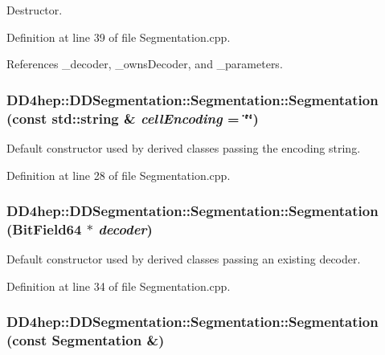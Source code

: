 Destructor. 

Definition at line 39 of file Segmentation.cpp.

References \_\-decoder, \_\-ownsDecoder, and \_\-parameters.\hypertarget{class_d_d4hep_1_1_d_d_segmentation_1_1_segmentation_a52364d20f9930e867d682ad453900e65}{
\subsubsection[{Segmentation}]{\setlength{\rightskip}{0pt plus 5cm}DD4hep::DDSegmentation::Segmentation::Segmentation (const std::string \& {\em cellEncoding} = {\ttfamily \char`\"{}\char`\"{}})}}
\label{class_d_d4hep_1_1_d_d_segmentation_1_1_segmentation_a52364d20f9930e867d682ad453900e65}


Default constructor used by derived classes passing the encoding string. 

Definition at line 28 of file Segmentation.cpp.\hypertarget{class_d_d4hep_1_1_d_d_segmentation_1_1_segmentation_a2c565cf9552a24845ed91c686fc63f40}{
\subsubsection[{Segmentation}]{\setlength{\rightskip}{0pt plus 5cm}DD4hep::DDSegmentation::Segmentation::Segmentation ({\bf BitField64} $\ast$ {\em decoder})}}
\label{class_d_d4hep_1_1_d_d_segmentation_1_1_segmentation_a2c565cf9552a24845ed91c686fc63f40}


Default constructor used by derived classes passing an existing decoder. 

Definition at line 34 of file Segmentation.cpp.\hypertarget{class_d_d4hep_1_1_d_d_segmentation_1_1_segmentation_aba1d0cb4ca5528c499ecde5f6000ae01}{
\subsubsection[{Segmentation}]{\setlength{\rightskip}{0pt plus 5cm}DD4hep::DDSegmentation::Segmentation::Segmentation (const {\bf Segmentation} \&)}}
\label{class_d_d4hep_1_1_d_d_segmentation_1_1_segmentation_aba1d0cb4ca5528c499ecde5f6000ae01}


